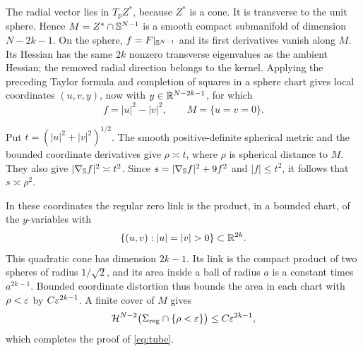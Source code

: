 The radial vector lies in \(T_pZ^*\), because \(Z^*\) is a cone.
It is transverse to the unit sphere.  Hence
\(M=Z^*\cap\mathbb S^{N-1}\) is a smooth compact submanifold of
dimension \(N-2k-1\).  On the sphere, \(f=F|_{\mathbb S^{N-1}}\)
and its first derivatives vanish along \(M\).  Its Hessian has
the same \(2k\) nonzero transverse eigenvalues as the ambient
Hessian; the removed radial direction belongs to the kernel.
Applying the preceding Taylor formula and completion of squares
in a sphere chart gives local coordinates \((u,v,y)\), now with
\(y\in\mathbb R^{N-2k-1}\), for which
\[
 f=|u|^2-|v|^2,\qquad M=\{u=v=0\}.
\]

Put \(t=(|u|^2+|v|^2)^{1/2}\).  The smooth positive-definite
spherical metric and the bounded coordinate derivatives give
\(\rho\asymp t\), where \(\rho\) is spherical distance to \(M\).
They also give \(|\nabla_{\mathbb S}f|^2\asymp t^2\).  Since
\(s=|\nabla_{\mathbb S}f|^2+9f^2\) and \(|f|\leq t^2\), it follows
that \(s\asymp\rho^2\).

In these coordinates the regular zero link is the product, in a
bounded chart, of the \(y\)-variables with
\[
 \{(u,v):|u|=|v|>0\}\subset\R^{2k}.
\]
This quadratic cone has dimension \(2k-1\).  Its link is the
compact product of two spheres of radius \(1/\sqrt2\), and its
area inside a ball of radius \(a\) is a constant times
\(a^{2k-1}\).  Bounded coordinate distortion thus bounds the
area in each chart with \(\rho<\varepsilon\) by
\(C\varepsilon^{2k-1}\).  A finite cover of \(M\) gives
\[
 \mathcal H^{N-2}\bigl(\Sigma_{\mathrm{reg}}\cap\{\rho<\varepsilon\}\bigr)
 \leq C\varepsilon^{2k-1},
\]
which completes the proof of \eqref{eq:tube}.
